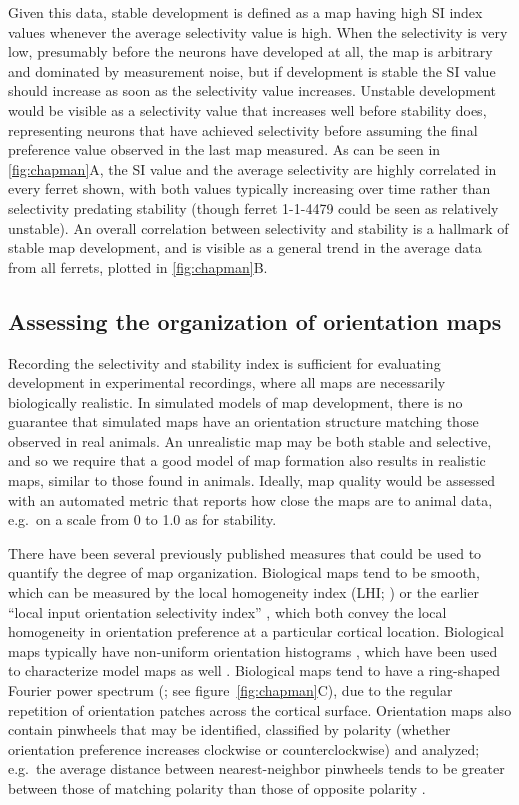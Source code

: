 \documentclass{article}
\begin{document}
Given this data, stable development is defined as a map having high SI
index values whenever the average selectivity value is high.  When the
selectivity is very low, presumably before the neurons have developed
at all, the map is arbitrary and dominated by measurement noise, but
if development is stable the SI value should increase as soon as the
selectivity value increases.  Unstable development would be visible as
a selectivity value that increases well before stability does,
representing neurons that have achieved selectivity before assuming
the final preference value observed in the last map measured.  As can be seen in
\ref{fig:chapman}A, the SI value and the average selectivity are
highly correlated in every ferret shown, with both values typically
increasing over time rather than selectivity predating stability
(though ferret 1-1-4479 could be seen as relatively unstable).  An
overall correlation between selectivity and stability is a hallmark of
stable map development, and is visible as a general trend in the average data from all ferrets, plotted in
\ref{fig:chapman}B.

\subsection*{Assessing the organization of orientation maps}

Recording the selectivity and stability index is sufficient for
evaluating development in experimental recordings, where all maps are
necessarily biologically realistic. In simulated models
of map development, there 
is no guarantee that simulated maps have an orientation structure
matching those observed in real animals. An unrealistic map may be
both stable and selective, and so we require that a good model of map
formation also results in realistic maps, similar to those
found in animals. Ideally, map quality would be assessed with an
automated metric that reports how close the maps are to animal data,
e.g.\ on a scale from 0 to 1.0 as for stability.

There have been several previously published
measures that could be used to quantify the degree of map
organization.  Biological maps tend to be smooth, which can be measured
by the local homogeneity index (LHI; \citealp{Nauhaus2008}) or the
earlier ``local input orientation selectivity index''
\citep{schummers:jpp04}, which both convey the local homogeneity in
orientation preference at a particular cortical location.  Biological
maps typically have non-uniform orientation histograms
\citep{coppola:pnas98,Muller2000,Tanaka2009}, which have been used to
characterize model maps as well \citep{bednar:neurocomputing04-or}.
Biological maps tend to have a ring-shaped Fourier power spectrum
(\citealp{Blasdel1992a,Blasde1992b,Erwin1995}; see
figure~\ref{fig:chapman}C), due to the regular repetition of
orientation patches across the cortical surface. Orientation maps
also contain pinwheels that may be identified, classified by
polarity (whether orientation preference increases clockwise or
counterclockwise) and analyzed; e.g.\ the average distance between
nearest-neighbor pinwheels tends to be greater between those of
matching polarity than those of opposite polarity
\citep{Muller2000}.
\end{document}
